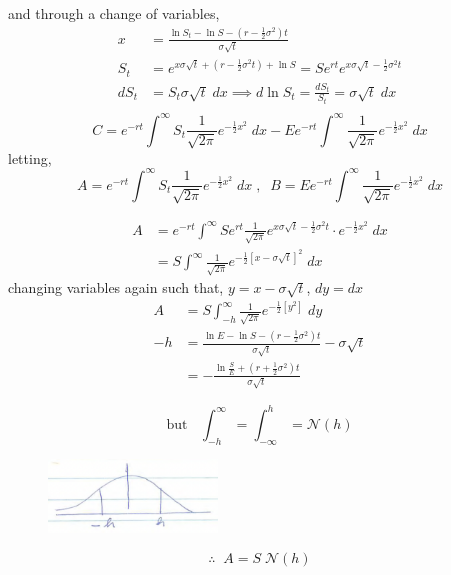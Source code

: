 \documentclass[
14pt,notheorems,hyperref={pdfauthor=whatever}
]{beamer}
\begin{document}
\begin{frame}
and through a change of variables,
\begin{align*}
    x &= \frac{\ln{S_t}-\ln{S}-(r-\frac{1}{2}\sigma^2)t}{\sigma\sqrt{t}}\\
    S_t &= e^{x\sigma\sqrt{t}+(r-\frac{1}{2}\sigma^2 t)+\ln S}=S e^{rt} e^{x\sigma\sqrt{t}-\frac{1}{2}\sigma^2 t}\\
    dS_t &= S_t \sigma\sqrt{t}\;dx \implies d\ln{S_t} = \frac{dS_t}{S_t} = \sigma \sqrt{t}\;dx\\
\end{align*}
\[ C = e^{-rt} \int^\infty S_t \frac{1}{\sqrt{2\pi}} e^{-\frac{1}{2} x^2}\;dx - E e^{-rt} \int^\infty \frac{1}{\sqrt{2\pi}} e^{-\frac{1}{2} x^2}\;dx\]
letting,
\[ A = e^{-rt} \int^\infty S_t \frac{1}{\sqrt{2\pi}} e^{-\frac{1}{2} x^2}\;dx\;,\;\; B = E e^{-rt} \int^\infty \frac{1}{\sqrt{2\pi}} e^{-\frac{1}{2} x^2}\;dx\]
\end{frame}

\begin{frame}
\begin{align*}
    A &= e^{-rt} \int^\infty S e^{rt} \frac{1}{\sqrt{2\pi}} e^{x\sigma\sqrt{t}-\frac{1}{2}\sigma^2 t}\cdot e^{-\frac{1}{2}x^2}\;dx\\
    &= S \int^\infty \frac{1}{\sqrt{2\pi}} e^{-\frac{1}{2}[x-\sigma\sqrt{t}]^2}\;dx
\end{align*}    
changing variables again such that, $y = x-\sigma\sqrt{t}$, $dy =dx$\\
\begin{align*}
    A &= S \int_{-h}^\infty \frac{1}{\sqrt{2\pi}} e^{-\frac{1}{2}[y^2]}\;dy\\
    -h &= \frac{\ln E - \ln S - (r-\frac{1}{2}\sigma^2)t}{\sigma\sqrt{t}}-\sigma\sqrt{t}\\
    &= - \frac{\ln{\frac{S}{E}}+(r+\frac{1}{2}\sigma^2)t}{\sigma\sqrt{t}}
\end{align*}
\end{frame}

\begin{frame}
\[\text{but } \;\; \int_{-h}^\infty = \int_{-\infty}^h = \mathcal{N}(h)\]
\begin{figure}[normal]
    \includegraphics[width=0.4\textwidth]{images/L16-normal.png}
    \centering
\end{figure}
\[ \therefore \;\; A = S\;\mathcal{N}(h) \]
\end{frame}
\end{document}
